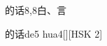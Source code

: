 \begin{entry}{的话}{8,8}{⽩、⾔}
  \begin{phonetics}{的话}{de5 hua4}[][HSK 2]
  \end{phonetics}
\end{entry}
